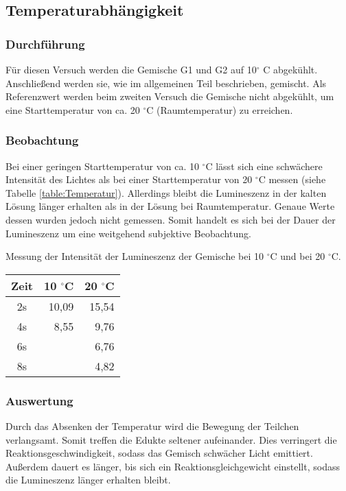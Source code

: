\subsection{Temperaturabhängigkeit}
\subsubsection{Durchführung}
Für diesen Versuch werden die Gemische G1 und G2 auf 10$^\circ$ C abgekühlt. Anschließend werden sie, wie im allgemeinen Teil beschrieben, gemischt. Als Referenzwert werden beim zweiten Versuch die Gemische nicht abgekühlt, um eine Starttemperatur von ca. 20 $^\circ$C (Raumtemperatur) zu erreichen.

\subsubsection{Beobachtung}
Bei einer geringen Starttemperatur von ca. 10 $^\circ$C lässt sich eine schwächere Intensität des Lichtes als bei einer Starttemperatur von 20 $^\circ$C messen (siehe Tabelle \ref{table:Temperatur}). Allerdings bleibt die Lumineszenz in der kalten Lösung länger erhalten als in der Lösung bei Raumtemperatur. Genaue Werte dessen wurden jedoch nicht gemessen. Somit handelt es sich bei der Dauer der Lumineszenz um eine weitgehend subjektive Beobachtung.

\begin{dsatable}
 \caption{Messung der Intensität der Lumineszenz der Gemische bei 10 $^\circ$C und bei 20 $^\circ$C.}
 \centering
 \begin{tabular}{crr} 
  \toprule
  Zeit      &  10 $^\circ$C  &  20 $^\circ$C \\
  \midrule
   2s		& 10,09 	& 15,54 \\
   4s		& 8,55		& 9,76	\\
   6s		&  			& 6,76	\\
   8s		& 			& 4,82	\\
  \bottomrule
 \end{tabular}
 \label{table:Temperatur}
\end{dsatable}

\subsubsection{Auswertung}
Durch das Absenken der Temperatur wird die Bewegung der Teilchen verlangsamt. Somit treffen die Edukte seltener aufeinander. Dies verringert die Reaktionsgeschwindigkeit, sodass das Gemisch schwächer Licht emittiert. Außerdem dauert es länger, bis sich ein Reaktionsgleichgewicht einstellt, sodass die Lumineszenz länger erhalten bleibt. 
